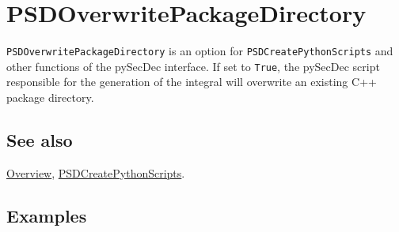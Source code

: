 \documentclass[../FeynHelpersManual.tex]{subfiles}
\begin{document}
\hypertarget{psdoverwritepackagedirectory}{
\section{PSDOverwritePackageDirectory}\label{psdoverwritepackagedirectory}}

\texttt{PSDOverwritePackageDirectory} is an option for
\texttt{PSDCreatePythonScripts} and other functions of the pySecDec
interface. If set to \texttt{True}, the pySecDec script responsible for
the generation of the integral will overwrite an existing C++ package
directory.

\subsection{See also}

\hyperlink{toc}{Overview},
\hyperlink{psdcreatepythonscripts}{PSDCreatePythonScripts}.

\subsection{Examples}
\end{document}
